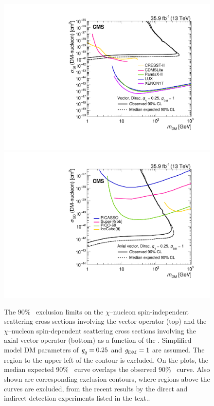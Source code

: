 \begin{figure}[htbp]
  \centering
    \includegraphics[width=0.45\textheight]{Impact/Figures/limits_direct.pdf}
    \includegraphics[width=0.45\textheight]{Impact/Figures/limits_indirect.pdf}
    \caption{
      The 90\% \CL\ exclusion limits on the $\chi$--nucleon spin-independent scattering cross sections involving the vector operator (top) and the $\chi$--nucleon spin-dependent scattering cross sections involving the axial-vector operator (bottom) as a function of the \mdm.
      Simplified model DM parameters of $\gq=0.25$ and $\gDM=1$ are assumed.
      The region to the upper left of the contour is excluded. 
      On the plots, the median expected 90\% \CL\ curve overlaps the observed 90\% \CL\ curve.
      Also shown are corresponding exclusion contours, where regions above the curves are excluded, from the recent results by the direct and indirect detection experiments listed in the text..
    }
    \label{fig:limits_direct}
\end{figure}

